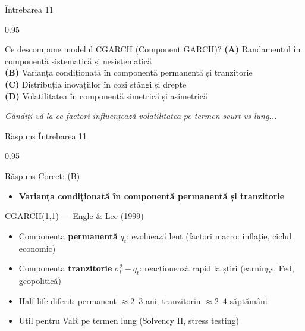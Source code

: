 \documentclass[9pt, aspectratio=169, t]{beamer}
\begin{document}
\begin{frame}{Întrebarea 11}
    \begin{cminipage}{0.95\textwidth}
    \begin{block}{Ce descompune modelul CGARCH (Component GARCH)?}
        \textcolor{MainBlue}{\textbf{(A)}} Randamentul în componentă sistematică și nesistematică\\[3pt]
        \textcolor{MainBlue}{\textbf{(B)}} Varianța condiționată în componentă permanentă și tranzitorie\\[3pt]
        \textcolor{MainBlue}{\textbf{(C)}} Distribuția inovațiilor în cozi stângi și drepte\\[3pt]
        \textcolor{MainBlue}{\textbf{(D)}} Volatilitatea în componentă simetrică și asimetrică
    \end{block}

    \vspace{0.5cm}

    \begin{center}
        \textit{Gândiți-vă la ce factori influențează volatilitatea pe termen scurt vs lung...}
    \end{center}
    \end{cminipage}
\end{frame}

\begin{frame}{Răspuns Întrebarea 11}
    \begin{cminipage}{0.95\textwidth}
    \begin{exampleblock}{Răspuns Corect: (B)}
        \begin{itemize}\setlength{\itemsep}{0pt}
            \item \textbf{Varianța condiționată în componentă permanentă și tranzitorie}
        \end{itemize}
    \end{exampleblock}

    \pause
    \begin{block}{CGARCH(1,1) --- Engle \& Lee (1999)}
        \begin{itemize}\setlength{\itemsep}{0pt}
            \item Componenta \textbf{permanentă} $q_t$: evoluează lent (factori macro: inflație, ciclul economic)
            \item Componenta \textbf{tranzitorie} $\sigma_t^2 - q_t$: reacționează rapid la știri (earnings, Fed, geopolitică)
            \item Half-life diferit: permanent $\approx 2$--$3$ ani; tranzitoriu $\approx 2$--$4$ săptămâni
            \item Util pentru VaR pe termen lung (Solvency II, stress testing)
        \end{itemize}
    \end{block}
    \end{cminipage}
\end{frame}
\end{document}
